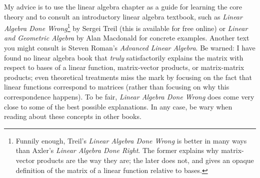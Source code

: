 My advice is to use the linear algebra chapter as a guide for learning the core theory and to consult an introductory linear algebra textbook, such as \textit{Linear Algebra Done Wrong}\footnote{Funnily enough, Treil's \textit{Linear Algebra Done Wrong} is better in many ways than Axler's \textit{Linear Algebra Done Right}. The former explains why matrix-vector products are the way they are; the later does not, and gives an opaque definition of the matrix of a linear function relative to bases.} by Sergei Treil (this is available for free online) or \textit{Linear and Geometric Algebra} by Alan Macdonald for concrete examples. Another text you might consult is Steven Roman's \textit{Advanced Linear Algebra}. Be warned: I have found no linear algebra book that \textit{truly} satisfactorily explains the matrix with respect to bases of a linear function, matrix-vector products, or matrix-matrix products; even theoretical treatments miss the mark by focusing on the fact that linear functions correspond to matrices (rather than focusing on why this correspondence happens). To be fair, \textit{Linear Algebra Done Wrong} does come very close to some of the best possible explanations. In any case, be wary when reading about these concepts in other books.